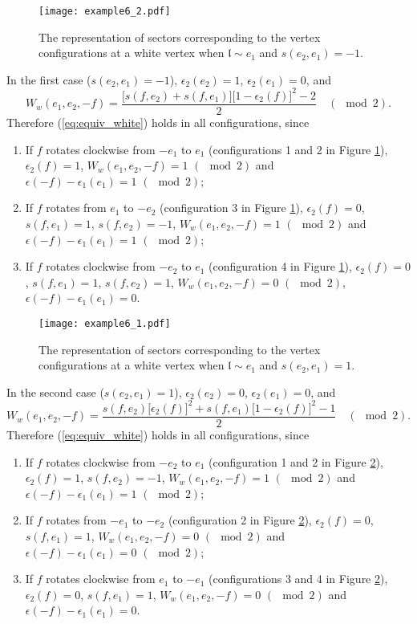 \documentclass[11pt]{amsart}
\theoremstyle{plain}
\numberwithin{equation}{section}
\begin{document}
\begin{figure}[H]
  \centering
  {\texttt{[image: example6\_2.pdf]}}
  \caption{The representation of sectors corresponding to the vertex configurations at a white vertex when $\mathfrak{l} \sim e_1$ and $s(e_2,e_1)=-1$.\label{fig:vertex1}}
\end{figure}

In the first case ($s(e_2,e_1)=-1$), $\epsilon_2(e_2)=1$, $\epsilon_2(e_1)=0$, and 
\[
W_w(e_1,e_2,-f)= \frac{\big[s(f,e_2) + s(f,e_1)\big]\big[1-\epsilon_2(f)\big]^2 -2}{2} \quad
(\!\!\!\!\!\!\mod 2).
\]
Therefore (\ref{eq:equiv_white}) holds in all configurations, since
\begin{enumerate}
\item If $f$ rotates clockwise from $-e_1$ to $e_1$ (configurations 1 and 2 in Figure \ref{fig:vertex1}), $\epsilon_2(f)=1$, $W_w(e_1,e_2,-f)=1\,\,
(\!\!\!\!\mod 2)$ and $\epsilon (-f) -\epsilon_1(e_1) = 1 \,\,
(\!\!\!\!\mod 2)$; 
\item If $f$ rotates from $e_1$ to $-e_2$ (configuration 3 in Figure \ref{fig:vertex1}), $\epsilon_2(f)=0$, $s(f,e_1)=1$, $s(f,e_2)=-1$,  $W_w(e_1,e_2,-f)=1\,\,(\!\!\!\!\mod 2)$ and $\epsilon (-f) -\epsilon_1(e_1) = 1 \,\,
(\!\!\!\!\mod 2)$;
\item If $f$ rotates clockwise from $-e_2$ to $e_1$ (configuration 4 in Figure \ref{fig:vertex1}), $\epsilon_2(f)=0$, $s(f,e_1)=1$, $s(f,e_2)=1$,  $W_w(e_1,e_2,-f)=0\,\,(\!\!\!\!\mod 2)$, $\epsilon (-f) -\epsilon_1(e_1) = 0$.
\end{enumerate}


\begin{figure}[H]
  \centering
  {\texttt{[image: example6\_1.pdf]}}
  \caption{The representation of sectors corresponding to the vertex configurations at a white vertex when $\mathfrak{l} \sim e_1$ and $s(e_2,e_1)=1$.\label{fig:vertex2}}
\end{figure}

In the second case ($s(e_2,e_1)=1$), $\epsilon_2(e_2)=0$, $\epsilon_2(e_1)=0$, and 
\[
W_w(e_1,e_2,-f)= \frac{ s(f,e_2) \big[\epsilon_2(f)\big]^2  + s(f,e_1)\big[1-\epsilon_2(f)\big]^2 -1}{2} \quad
(\!\!\!\!\!\!\mod 2).
\]
Therefore (\ref{eq:equiv_white}) holds in all configurations, since
\begin{enumerate}
\item If $f$ rotates clockwise from $-e_2$ to $e_1$ (configuration 1 and 2 in Figure \ref{fig:vertex2}), $\epsilon_2(f)=1$, $s(f,e_2)=-1$, $W_w(e_1,e_2,-f)=1\,\,
(\!\!\!\!\mod 2)$ and $\epsilon (-f) -\epsilon_1(e_1) = 1 \,\,
(\!\!\!\!\mod 2)$; 
\item If $f$ rotates from $-e_1$ to $-e_2$ (configuration 2 in Figure \ref{fig:vertex2}), $\epsilon_2(f)=0$, $s(f,e_1)=1$, $W_w(e_1,e_2,-f)=0\,\,
(\!\!\!\!\mod 2)$ and $\epsilon (-f) -\epsilon_1(e_1) = 0 \,\,
(\!\!\!\!\mod 2)$;
\item If $f$ rotates clockwise from $e_1$ to $-e_1$ (configurations 3 and 4 in Figure \ref{fig:vertex2}), $\epsilon_2(f)=0$, $s(f,e_1)=1$,  $W_w(e_1,e_2,-f)=0\,\,
(\!\!\!\!\mod 2)$ and $\epsilon (-f) -\epsilon_1(e_1) = 0$.
\end{enumerate}
\end{document}
